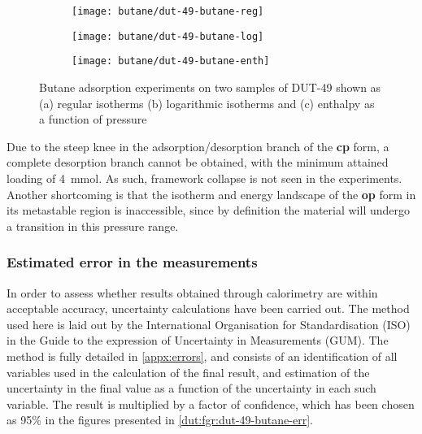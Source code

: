 \begin{figure}[htb]
    \centering
    \begin{subfigure}{0.33\linewidth}
        \texttt{[image: butane/dut-49-butane-reg]}%
        \caption{}\label{dut:fgr:dut-49-butane-reg}
    \end{subfigure}%
    \begin{subfigure}{0.33\linewidth}
        \texttt{[image: butane/dut-49-butane-log]}%
        \caption{}\label{dut:fgr:dut-49-butane-log}
    \end{subfigure}%
    \begin{subfigure}{0.33\linewidth}
        \texttt{[image: butane/dut-49-butane-enth]}%
        \caption{}\label{dut:fgr:dut-49-butane-enth}
    \end{subfigure}%
    \caption{Butane adsorption experiments on two samples of 
    DUT-49 shown as (a) regular isotherms (b) logarithmic isotherms 
    and (c) enthalpy as a function of pressure}%
    \label{dut:fgr:dut-49-butane}
\end{figure}

Due to the steep knee in the adsorption/desorption branch of the 
\textbf{cp} form, a complete desorption branch cannot be obtained,
with the minimum attained loading of \SI{4}{\milli\mol}. As such,
framework collapse is not seen in the experiments. Another 
shortcoming is that the isotherm
and energy landscape of the \textbf{op} form in its metastable 
region is inaccessible, since by definition the material will 
undergo a transition in this pressure range.


\subsubsection{Estimated error in the measurements}

In order to assess whether results obtained through calorimetry
are within acceptable accuracy, uncertainty calculations have been
carried out. The method used here is laid out by the International 
Organisation for Standardisation (ISO) in the Guide to the expression
of Uncertainty in Measurements (GUM). The method is fully detailed 
in \autoref{appx:errors}, and consists of an identification of 
all variables used in the calculation of the final result, and 
estimation of the uncertainty in the final value as a function of
the uncertainty in each such variable. The result is multiplied
by a factor of confidence, which has been chosen as 95\% in the 
figures presented in \autoref{dut:fgr:dut-49-butane-err}.


